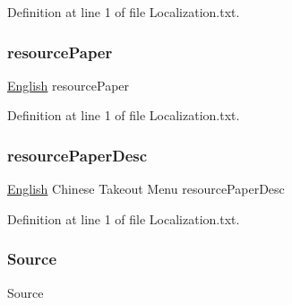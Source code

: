 Definition at line 1 of file Localization.\+txt.

\mbox{\label{_dishong_01_tower_01_challenge_2_config_2_localization_8txt_a377816a60654699f149f7cef3da74d15}} 
\subsubsection{\texorpdfstring{resourcePaper}{resourcePaper}}
{\footnotesize\ttfamily \mbox{\hyperlink{_sphere_i_i_01_winter_01_project_2_config_2_localization_8txt_ad896b63205779b1b09e86d941ce13976}{English}} resource\+Paper}



Definition at line 1 of file Localization.\+txt.

\mbox{\label{_dishong_01_tower_01_challenge_2_config_2_localization_8txt_a0908175035e4f29928ff117ea7c860f2}} 
\subsubsection{\texorpdfstring{resourcePaperDesc}{resourcePaperDesc}}
{\footnotesize\ttfamily \mbox{\hyperlink{_sphere_i_i_01_winter_01_project_2_config_2_localization_8txt_ad896b63205779b1b09e86d941ce13976}{English}} Chinese Takeout Menu resource\+Paper\+Desc}



Definition at line 1 of file Localization.\+txt.

\mbox{\label{_dishong_01_tower_01_challenge_2_config_2_localization_8txt_a176e1eca2d1e3d1c6a064340bc6a351e}} 
\subsubsection{\texorpdfstring{Source}{Source}}
{\footnotesize\ttfamily Source}



